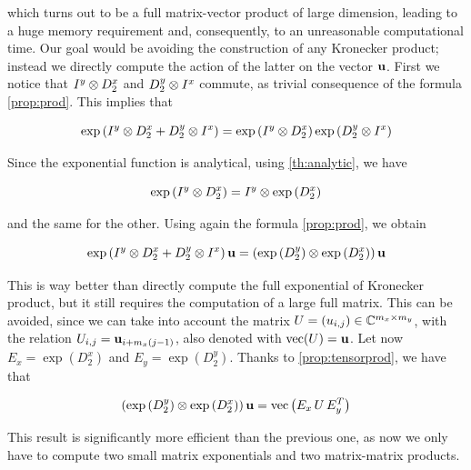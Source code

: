 which turns out to be a full matrix-vector product of large dimension, leading to a huge memory requirement and, consequently, to an unreasonable computational time. Our goal would be avoiding the construction of any Kronecker product; instead we directly compute the action of the latter on the vector $\mathbf{u}$. First we notice that $I^y \otimes D_2^x$ and $D_2^y \otimes I^x$ commute, as trivial consequence of the formula \eqref{prop:prod}. This implies that 

\[ \exp\left(I^y \otimes D_2^x + D_2^y \otimes I^x\right) = \exp\left(I^y \otimes D_2^x\right)\exp\left(D_2^y \otimes I^x\right) \]

Since the exponential function is analytical, using \eqref{th:analytic}, we have

\[ \exp\left(I^y \otimes D_2^x\right) = I^y \otimes \exp\left(D_2^x\right) \]

and the same for the other. Using again the formula \eqref{prop:prod}, we obtain 

\[ \exp\left(I^y \otimes D_2^x + D_2^y \otimes I^x\right)\mathbf{u} = \left(\exp\left(D_2^y\right) \otimes \exp\left(D_2^x\right)\right)\mathbf{u} \]

This is way better than directly compute the full exponential of Kronecker product, but it still requires the computation of a large full matrix. This can be avoided, since we can take into account the matrix $U = (u_{i,j}) \in \mathbb{C}^{m_x \times m_y}$, with the relation $U_{i,j} = \mathbf{u}_{i + m_x(j - 1)}$, also denoted with $\mbox{vec}(U) = \mathbf{u}$. Let now $E_x = \exp\left(D_2^x\right)$ and $E_y = \exp\left(D_2^y\right)$. Thanks to \eqref{prop:tensorprod}, we have that 

\[\left(\exp\left(D_2^y\right) \otimes \exp\left(D_2^x\right)\right)\mathbf{u} = \mathrm{vec}\left(E_x \, U \, E_y^T\right)\]

This result is significantly more efficient than the previous one, as now we only have to compute two small matrix exponentials and two matrix-matrix products.

